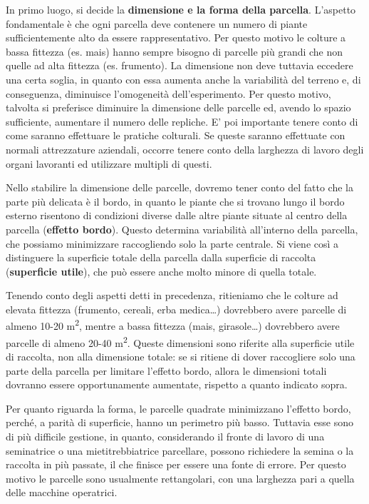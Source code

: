 \documentclass[a4paper,12pt,oneside]{book}
\begin{document}
In primo luogo, si decide la \textbf{dimensione e la forma della parcella}. L'aspetto fondamentale è che ogni parcella deve contenere un numero di piante sufficientemente alto da essere rappresentativo. Per questo motivo le colture a bassa fittezza (es. mais) hanno sempre bisogno di parcelle più grandi che non quelle ad alta fittezza (es. frumento). La dimensione non deve tuttavia eccedere una certa soglia, in quanto con essa aumenta anche la variabilità del terreno e, di conseguenza, diminuisce l'omogeneità dell'esperimento. Per questo motivo, talvolta si preferisce diminuire la dimensione delle parcelle ed, avendo lo spazio sufficiente, aumentare il numero delle repliche. E' poi importante tenere conto di come saranno effettuare le pratiche colturali. Se queste saranno effettuate con normali attrezzature aziendali, occorre tenere conto della larghezza di lavoro degli organi lavoranti ed utilizzare multipli di questi.

Nello stabilire la dimensione delle parcelle, dovremo tener conto del fatto che la parte più delicata è il bordo, in quanto le piante che si trovano lungo il bordo esterno risentono di condizioni diverse dalle altre piante situate al centro della parcella (\textbf{effetto bordo}). Questo determina variabilità all'interno della parcella, che possiamo minimizzare raccogliendo solo la parte centrale. Si viene così a distinguere la superficie totale della parcella dalla superficie di raccolta (\textbf{superficie utile}), che può essere anche molto minore di quella totale.

Tenendo conto degli aspetti detti in precedenza, ritieniamo che le colture ad elevata fittezza (frumento, cereali, erba medica\ldots{}) dovrebbero avere parcelle di almeno 10-20 m\textsuperscript{2}, mentre a bassa fittezza (mais, girasole\ldots{}) dovrebbero avere parcelle di almeno 20-40 m\textsuperscript{2}. Queste dimensioni sono riferite alla superficie utile di raccolta, non alla dimensione totale: se si ritiene di dover raccogliere solo una parte della parcella per limitare l'effetto bordo, allora le dimensioni totali dovranno essere opportunamente aumentate, rispetto a quanto indicato sopra.

Per quanto riguarda la forma, le parcelle quadrate minimizzano l'effetto bordo, perché, a parità di superficie, hanno un perimetro più basso. Tuttavia esse sono di più difficile gestione, in quanto, considerando il fronte di lavoro di una seminatrice o una mietitrebbiatrice parcellare, possono richiedere la semina o la raccolta in più passate, il che finisce per essere una fonte di errore. Per questo motivo le parcelle sono usualmente rettangolari, con una larghezza pari a quella delle macchine operatrici.
\end{document}
